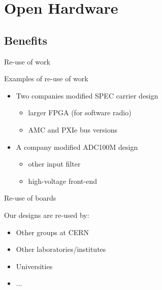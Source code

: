 \documentclass[compress,red]{beamer}
\begin{document}
\section{Open Hardware}

\subsection{Benefits}

\begin{frame}{Re-use of work}

  \begin{block}{Examples of re-use of work}
    \begin{itemize}
    \item Two companies modified SPEC carrier design
      \begin{itemize}
      \item larger FPGA (for software radio)
      \item AMC and PXIe bus versions
      \end{itemize}
    \item A company modified ADC100M design
      \begin{itemize}
      \item other input filter
      \item high-voltage front-end
      \end{itemize}
    \end{itemize}
  \end{block}

\end{frame}

\begin{frame}{Re-use of boards}

  \begin{block}{Our designs are re-used by:}
    \begin{itemize}
    \item Other groups at CERN
    \item Other laboratories/institutes
    \item Universities
    \item ...
    \end{itemize}
  \end{block}

\end{frame}
\end{document}
